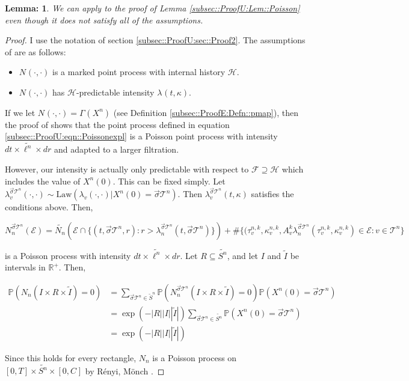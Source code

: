 \documentclass[12pt]{article}
\newcommand{\mb}{\mathbb}
\newcommand{\mc}{\mathcal}
\newcommand{\te}{\text}
\newcommand{\ind}{\hspace{24pt}}
\newcommand{\pr}{\mb{P}}							%
\renewcommand{\v}{v}							%
\renewcommand{\S}{S}							%
\newcommand{\s}{\sigma}							%
\newcommand{\sv}{\vec{\s}}						%
\renewcommand{\t}{t}							%
\newcommand{\poiss}[1]{N_{#1}}						%
\newcommand{\law}{\te{Law}}							%
\newcommand{\pup}[1]{^{#1}}							%
\newcommand{\tree}{\mc{T}}							%
\renewcommand{\r}{r}								%
\newcommand{\rt}[1]{\tau^{#1}}						%
\renewcommand{\it}{k}								%
\newcommand{\numb}{n}								%
\newcommand{\XState}[1]{\S^{#1}}				%
\newcommand{\rxvtn}[3]{X_{#1}^{#3}(#2)}				%
\newcommand{\rxvtsn}[3]{X_{#1}^{#3}{#2}}			%
\newcommand{\rate}[1]{\lambda_{#1}}					%
\newcommand{\const}[1]{C_{#1}}						%
\newcommand{\Sm}{\ell}								%
\newcommand{\alt}{\widetilde}						%
\newcommand{\rv}{A}								%
\newcommand{\evnt}{\mc{E}}						%
\renewcommand{\mark}[1]{\kappa^{#1}}				%
\newcommand{\pmap}[1]{\Gamma_{#1}}				%
\newcommand{\inte}{I}							%
\newtheorem{lem}[thms]{Lemma: }
\begin{document}
\begin{lem}
We can apply \cite[Proposition 14.7.I(b)]{DalVer08} to the proof of Lemma \ref{subsec::ProofU:Lem::Poisson} even though it does not satisfy all of the assumptions.
\label{sec::TL:Lem::embedding}
\end{lem}
\begin{proof}
I use the notation of section \ref{subsec::ProofU:sec::Proof2}. The assumptions of \cite[Proposition 14.7.I(b)]{DalVer08} are as follows:

\begin{itemize}
\item \(\poiss{}(\cdot,\cdot)\) is a marked point process with internal history \(\mc{H}\).

\item \(\poiss{}(\cdot,\cdot)\) has \(\mc{H}\)-predictable intensity \(\rate{}(\t,\kappa)\).
\end{itemize}

If we let \(\poiss{}(\cdot,\cdot) = \pmap{}(\rxvtsn{}{}{\numb})\) (see Definition \ref{subsec::ProofE:Defn::pmap}), then the proof of \cite[Proposition 14.7.I(b)]{DalVer08} shows that the point process defined in equation \eqref{subsec::ProofU:eqn::Poissonexpl} is a Poisson point process with intensity \(d\t\times \alt{\Sm^\numb}\times d\r\) and adapted to a larger filtration.

\ind However, our intensity is actually only predictable with respect to \(\mc{F} \supseteq \mc{H}\) which includes the value of \(\rxvtn{}{0}{\numb}\). This can be fixed simply. Let \(\rate{\v}^{\sv{}{\tree\pup{\numb}}}(\cdot,\cdot) \sim \law(\rate{\v}(\cdot,\cdot)|\rxvtn{}{0}{\numb} = \sv{}{\tree\pup{\numb}})\). Then \(\rate{\v}^{\sv{}{\tree\pup{\numb}}}(t,\kappa)\) satisfies the conditions above. Then,

\[\poiss{\numb}^{\sv{}{\tree\pup{\numb}}}(\evnt) = \alt{\poiss{\numb}}\left(\evnt\cap\{(t,\sv{}{\tree\pup{\numb}},\r):\r > \rate{\numb}^{\sv{}{\tree\pup{\numb}}}(\t,\sv{}{\tree\pup{\numb}})\}\right) + \#\{(\rt{\numb,\it}_\v,\mark{\numb,\it}_\v,\rv_{\v}^{\it}\rate{\numb}^{\sv{}{\tree\pup{\numb}}}(\rt{\numb,\it}_\v,\mark{\numb,\it}_\v) \in \evnt: \v\in \tree\pup{\numb}\}\]

is a Poisson process with intensity \(d\t\times \alt{\Sm^\numb}\times d\r\). Let \(R \subseteq \alt{\S^\numb}\), and let \(\inte\) and \(\alt{\inte}\) be intervals in \(\mb{R}^+\). Then,

\begin{align*}
\pr\left(\poiss{\numb}\left(\inte\times R\times \alt{\inte}\right) = 0\right) &= \sum_{\sv{}{\tree\pup{\numb}} \in \alt{S}^\numb} \pr\left(\poiss{\numb}^{\sv{}{\tree\pup{\numb}}}\left(\inte\times R\times \alt{\inte}\right) = 0\right)\pr(\rxvtn{}{0}{\numb} = \sv{}{\tree\pup{\numb}})\\
&= \exp\left(-|R| |\inte||\alt{\inte}|\right)\sum_{\sv{}{\tree\pup{\numb}} \in \alt{S^\numb}} \pr(\rxvtn{}{0}{\numb} = \sv{}{\tree\pup{\numb}})\\
&=\exp\left(-|R| |\inte||\alt{\inte}|\right)
\end{align*}

Since this holds for every rectangle, \(\poiss{\numb}\) is a Poisson process on \([0,T]\times \alt{\S^\numb}\times [0,\const{}]\) by R\'enyi, M\"onch \cite[Theorem 9.2.XII]{DalVer08}.



\end{proof}
\newpage


\end{document}
